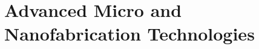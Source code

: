 \documentclass[
11pt, %
fleqn, %
a4paper, %
]{LegrandOrangeBook}
\begin{document}
	
	
	
	
	
	
	
	
	
	\pagestyle{empty} %
	
	\tableofcontents %
	
	
	
	\pagestyle{fancy} %
	
	
	
	\part{Advanced Micro and Nanofabrication Technologies}
	
	
	
	
	
	
	
	
\end{document}
